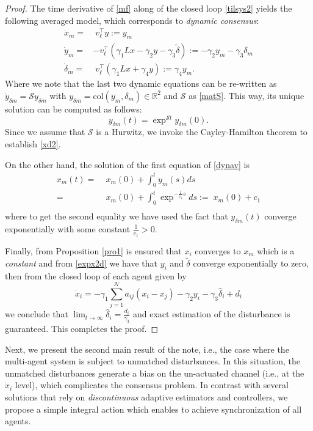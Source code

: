 \documentclass[journal,twoside]{IEEEtran}
\newcommand{\col}{ \mbox{col} }
\def\rea{\mathbb{R}}
\def\rea{\mathbb{R}}
\def\col{\mbox{col}}
\begin{document}
  
\begin{proof}
The time derivative of \eqref{mf} along of the closed loop  \eqref{tilsys2} yields the following averaged model, which corresponds to {\it dynamic consensus}:
\begin{align}
\dot x_{m}=&\; v_\ell^\top y:= y_{m} \nonumber \\
\dot y_{m}= &- v_\ell^\top \left( \gamma_1 L x -\gamma_2 y - \gamma_3 \tilde \delta \right):= - \gamma_2 y_{m} - \gamma_3 \delta_m \nonumber \\
\dot \delta_m=&\; v_\ell^\top (\gamma_1 L x + \gamma_4 y):= \gamma_4y_{m}.
\label{dynav}
\end{align}
Where we note that the last two dynamic equations can be re-written as $\dot y_{\delta m}= {\mathcal S}  y_{\delta m}$ with $y_{\delta m}= \col(y_{m}, \delta_m) \in \rea^2$ and ${\mathcal S}$ as \eqref{matS}. 
This way, its unique solution can be computed as follows: 
\begin{equation}
\label{expx2d}
y_{\delta m}(t)=\exp^{{\mathcal S}t}y_{\delta m}(0).
\end{equation}
Since we assume that ${\mathcal S}$ is a Hurwitz, we invoke the Cayley-Hamilton theorem to establish \eqref{xd2}. 

On the other hand, the solution of the first equation of \eqref{dynav}  is 
\begin{align}
x_{m}(t)=&\; x_{m}(0)+\int_{0}^t y_{m}(s)ds \nonumber \\
=& \; x_{m}(0) +\int_{0}^t \exp^{-\frac{1}{c_1} s} ds :=  \; x_{m} (0)+c_1 \nonumber \\
\end{align}
where to get the second equality we have used the fact that $y_{\delta m}(t)$ converge exponentially with some constant $\frac{1}{c_1}>0$.

Finally, from Proposition \ref{pro1} is ensured that $x_{i}$ converges to $x_{m}$ which is  a {\it constant} and  from \eqref{expx2d} we have that $y_{i}$ and $\tilde \delta$ converge exponentially to zero,  then from the closed loop of each agent given by 
$$
\dot x_{i}= -\gamma_1 \sum\limits_{j=1}^{\mathcal N} a_{ij} (x_{i}-x_{j})-\gamma_2 y_{i}  -\gamma_3 \hat \delta_i  +d_i 
$$
we conclude that $\lim_{t \to \infty} \hat \delta_i = \frac{d_i}{\gamma_3}$ and exact estimation of the disturbance is guaranteed.
This completes the proof.
 \end{proof}
 
% 
Next, we present the second main result of the note, i.e., the case where the multi-agent system is subject to unmatched disturbances. 
In this situation, the unmatched disturbances generate a bias on the un-actuated channel (i.e., at the $\dot x_i$ level), which complicates the consensus problem.
In contrast with several solutions \cite{GUetal21, ZHENGetal23, XIAOetal22} that  rely on \emph{discontinuous} adaptive estimators and controllers, we propose a simple integral action which enables to achieve synchronization of all agents. 
  
\end{document}
